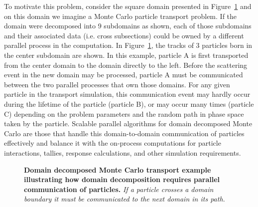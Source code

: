 \documentclass[letterpaper,11pt]{article}
\begin{document}
To motivate this problem, consider the square domain presented in
Figure~\ref{fig:ddmc_example} and on this domain we imagine a Monte
Carlo particle transport problem. If the domain were decomposed into 9
subdomains as shown, each of those subdomains and their associated
data (i.e. cross subsections) could be owned by a different parallel
process in the computation. In Figure~\ref{fig:ddmc_example}, the
tracks of 3 particles born in the center subdomain are shown. In this
example, particle A is first transported from the center domain to the
domain directly to the left. Before the scattering event in the new
domain may be processed, particle A must be communicated between the
two parallel processes that own those domains. For any given particle
in the transport simulation, this communication event may hardly occur
during the lifetime of the particle (particle B), or may occur many
times (particle C) depending on the problem parameters and the random
path in phase space taken by the particle. Scalable parallel
algorithms for domain decomposed Monte Carlo are those that handle
this domain-to-domain communication of particles effectively and
balance it with the on-process computations for particle interactions,
tallies, response calculations, and other simulation requirements.
\begin{figure}[t!]
  \begin{center}
    \scalebox{1.5}{
       }
  \end{center}
  \caption{\textbf{Domain decomposed Monte Carlo transport example
      illustrating how domain decomposition requires parallel
      communication of particles.} \textit{If a particle crosses a
      domain boundary it must be communicated to the next domain in
      its path.}}
  \label{fig:ddmc_example}
\end{figure}
\end{document}
